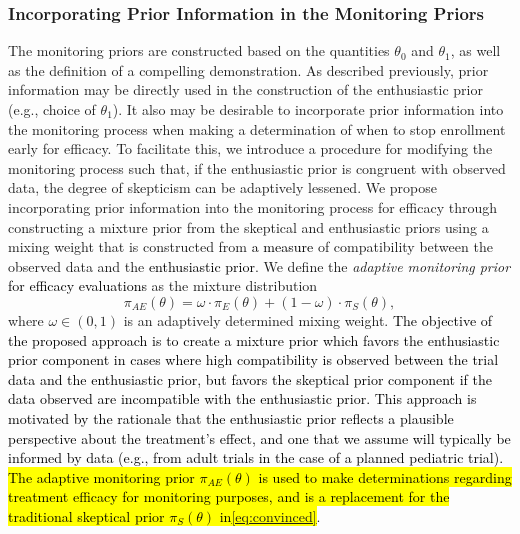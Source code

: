 \documentclass[12pt]{article}
\begin{document}
\subsubsection{Incorporating Prior Information in the Monitoring Priors}\label{sec:incorporating}
The monitoring priors are constructed based on the quantities $\theta_0$ and $\theta_1$, as well as the definition of a compelling demonstration. 
%
As described previously, prior information may be directly used in the construction of the enthusiastic prior (e.g., choice of $\theta_1$).
%
It also may be desirable to incorporate prior information into the monitoring process when making a determination of when to stop enrollment 
early for efficacy.
%
To facilitate this, we introduce a procedure for modifying the monitoring process such that, if the enthusiastic prior is congruent with observed data, the degree of skepticism can be adaptively lessened.
We propose incorporating prior information into the monitoring process for efficacy through constructing a mixture prior
from the skeptical and enthusiastic priors using a mixing weight that is constructed from \textcolor{black}{a measure} of compatibility between the
observed data and the \textcolor{black}{enthusiastic prior}. 
We define the \textit{adaptive monitoring prior} \textcolor{black}{for efficacy evaluations} as the mixture distribution	
\begin{equation}\label{eq:inference_prior}
	\pi_{AE}\left(\theta\right)=\omega\cdot\pi_E(\theta)+(1 - \omega)\cdot \pi_S(\theta),
\end{equation}
where $\omega\in(0,1)$ is an adaptively determined mixing weight. %
%
\textcolor{black}{The objective of the proposed approach is to create a mixture prior which favors the enthusiastic prior component in cases where high compatibility is observed between the trial data and the enthusiastic prior, but favors the skeptical prior component if the data observed are incompatible with the enthusiastic prior. This approach is motivated by the rationale that the enthusiastic prior reflects a plausible perspective about the treatment's effect, and one that we assume will typically be informed by data (e.g., from adult trials in the case of a planned pediatric trial).} \hl{The adaptive monitoring prior $\pi_{AE}(\theta)$ is used to make determinations regarding treatment efficacy for monitoring purposes, and is a replacement for the traditional skeptical prior $\pi_S(\theta)$ in}\colorbox{yellow}{\eqref{eq:convinced}}.
\end{document}
